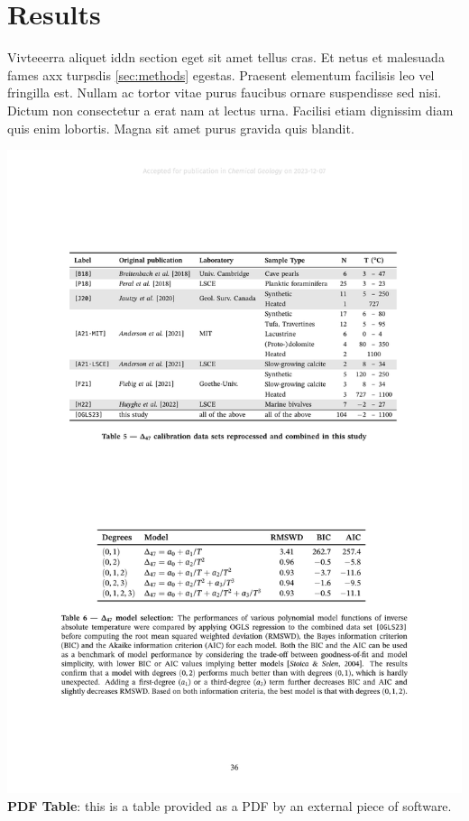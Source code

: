 \hypertarget{results}{%
\section{Results}\label{results}}

Vivteeerra aliquet iddn section eget sit amet tellus cras. Et netus et
malesuada fames axx turpsdis \ref{sec:methods} egestas. Praesent
elementum facilisis leo vel fringilla est. Nullam ac tortor vitae purus
faucibus ornare suspendisse sed nisi. Dictum non consectetur a erat nam
at lectus urna. Facilisi etiam dignissim diam quis enim lobortis. Magna
sit amet purus gravida quis blandit.

\begin{table}[b!]
\center
\includegraphics[]{input/table-pdf}\\
\caption{
\textbf{PDF Table}: this is a table provided as a PDF by an external
piece of software.
}
\label{tab:pdf}
\end{table}

